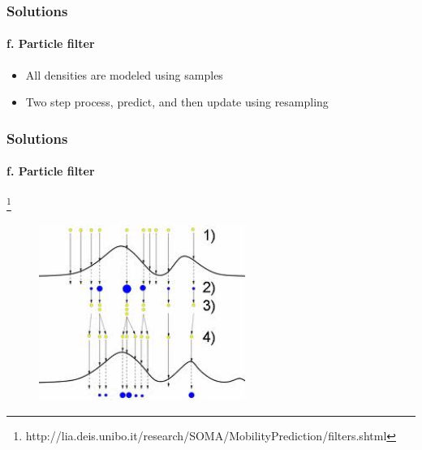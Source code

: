 %











\begin{frame}
\frametitle{Solutions}
\framesubtitle{f. Particle filter}
\mypagenum
\begin{itemize}
\item All densities are modeled using samples
\item Two step process, predict, and then update using resampling
\end{itemize}
\end{frame}




\begin{frame}
\frametitle{Solutions}
\framesubtitle{f. Particle filter}
\mypagenum
\footnote{\tiny http://lia.deis.unibo.it/research/SOMA/MobilityPrediction/filters.shtml}
\begin{figure}
\includegraphics[width=0.6\textwidth]{figs/PRML_update.jpg}
\end{figure}
\end{frame}



